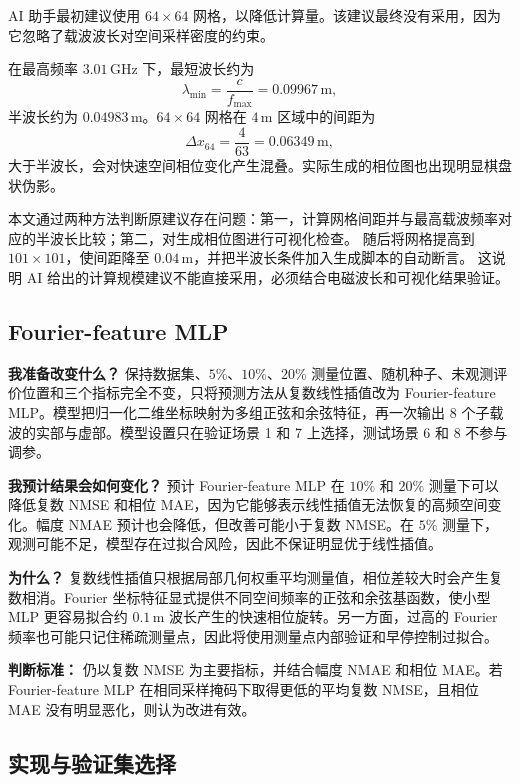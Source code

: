 \documentclass[UTF8,a4paper,11pt]{ctexart}
\begin{document}
AI 助手最初建议使用 $64\times64$ 网格，以降低计算量。该建议最终没有采用，因为它忽略了载波波长对空间采样密度的约束。

在最高频率 $3.01\,\mathrm{GHz}$ 下，最短波长约为
\begin{equation}
    \lambda_{\min}=\frac{c}{f_{\max}}=0.09967\,\mathrm m,
\end{equation}
半波长约为 $0.04983\,\mathrm m$。$64\times64$ 网格在 $4\,\mathrm m$ 区域中的间距为
\begin{equation}
    \Delta x_{64}=\frac{4}{63}=0.06349\,\mathrm m,
\end{equation}
大于半波长，会对快速空间相位变化产生混叠。实际生成的相位图也出现明显棋盘状伪影。

本文通过两种方法判断原建议存在问题：第一，计算网格间距并与最高载波频率对应的半波长比较；第二，对生成相位图进行可视化检查。
随后将网格提高到 $101\times101$，使间距降至 $0.04\,\mathrm m$，并把半波长条件加入生成脚本的自动断言。
这说明 AI 给出的计算规模建议不能直接采用，必须结合电磁波长和可视化结果验证。

\subsection{Fourier-feature MLP}

\textbf{我准备改变什么？}
保持数据集、$5\%$、$10\%$、$20\%$ 测量位置、随机种子、未观测评价位置和三个指标完全不变，只将预测方法从复数线性插值改为 Fourier-feature MLP。模型把归一化二维坐标映射为多组正弦和余弦特征，再一次输出 8 个子载波的实部与虚部。模型设置只在验证场景 1 和 7 上选择，测试场景 6 和 8 不参与调参。

\textbf{我预计结果会如何变化？}
预计 Fourier-feature MLP 在 $10\%$ 和 $20\%$ 测量下可以降低复数 NMSE 和相位 MAE，因为它能够表示线性插值无法恢复的高频空间变化。幅度 NMAE 预计也会降低，但改善可能小于复数 NMSE。在 $5\%$ 测量下，观测可能不足，模型存在过拟合风险，因此不保证明显优于线性插值。

\textbf{为什么？}
复数线性插值只根据局部几何权重平均测量值，相位差较大时会产生复数相消。Fourier 坐标特征显式提供不同空间频率的正弦和余弦基函数，使小型 MLP 更容易拟合约 $0.1\,\mathrm m$ 波长产生的快速相位旋转\cite{fourierfeatures}。另一方面，过高的 Fourier 频率也可能只记住稀疏测量点，因此将使用测量点内部验证和早停控制过拟合。

\textbf{判断标准：}
仍以复数 NMSE 为主要指标，并结合幅度 NMAE 和相位 MAE。若 Fourier-feature MLP 在相同采样掩码下取得更低的平均复数 NMSE，且相位 MAE 没有明显恶化，则认为改进有效。

\subsection{实现与验证集选择}
\end{document}
